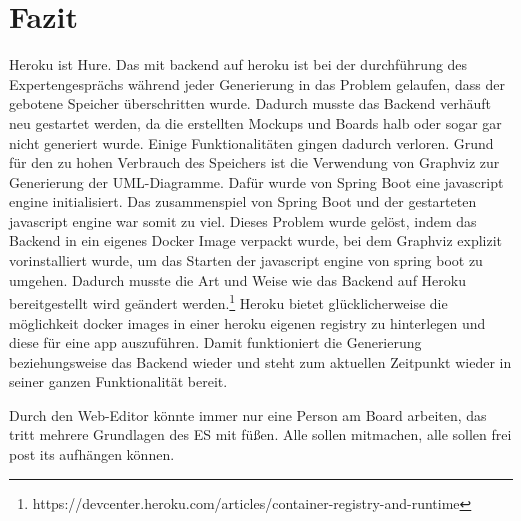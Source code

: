 \chapter{Fazit}\label{ch:fazit}

Heroku ist Hure.
Das mit backend auf heroku ist bei der durchführung des Expertengesprächs während jeder Generierung in das Problem gelaufen,
dass der gebotene Speicher überschritten wurde.
Dadurch musste das Backend verhäuft neu gestartet werden, da die erstellten Mockups und Boards halb oder sogar gar nicht generiert wurde.
Einige Funktionalitäten gingen dadurch verloren.
Grund für den zu hohen Verbrauch des Speichers ist die Verwendung von Graphviz zur Generierung der UML-Diagramme.
Dafür wurde von Spring Boot eine javascript engine initialisiert.
Das zusammenspiel von Spring Boot und der gestarteten javascript engine war somit zu viel.
Dieses Problem wurde gelöst, indem das Backend in ein eigenes Docker Image verpackt wurde, bei dem Graphviz explizit vorinstalliert wurde,
um das Starten der javascript engine von spring boot zu umgehen.
Dadurch musste die Art und Weise wie das Backend auf Heroku bereitgestellt wird geändert werden.\footnote{https://devcenter.heroku.com/articles/container-registry-and-runtime}
Heroku bietet glücklicherweise die möglichkeit docker images in einer heroku eigenen registry zu hinterlegen und diese für eine app auszuführen.
Damit funktioniert die Generierung beziehungsweise das Backend wieder und steht zum aktuellen Zeitpunkt wieder in seiner ganzen Funktionalität bereit.






Durch den Web-Editor könnte immer nur eine Person am Board arbeiten, das tritt mehrere Grundlagen des ES mit füßen.
Alle sollen mitmachen, alle sollen frei post its aufhängen können.
